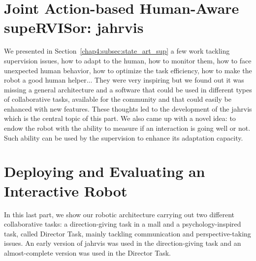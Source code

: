 \documentclass[english,a4paper,11pt,twoside]{StyleThese}
\begin{document}
\part{Joint Action-based Human-Aware supeRVISor: \acrshort{jahrvis}}\label{part:part3}
\begin{partintro}
	We presented in Section~\ref{chap4:subsec:state_art_sup} a few work tackling supervision issues, \ie how to adapt to the human, how to monitor them, how to face unexpected human behavior, how to optimize the task efficiency, how to make the robot a good human helper... They were very inspiring but we found out it was missing a general architecture and a software that could be used in different types of collaborative tasks, available for the community and that could easily be enhanced with new features. These thoughts led to the development of the \acrfull{jahrvis} which is the central topic of this part. We also came up with a novel idea: to endow the robot with the ability to measure if an interaction is going well or not. Such ability can be used by the supervision to enhance its adaptation capacity.
\end{partintro}





\part{Deploying and Evaluating an Interactive Robot}\label{part:part4}
\begin{partintro}
	In this last part, we show our robotic architecture carrying out two different collaborative tasks: a direction-giving task in a mall and a psychology-inspired task, called Director Task, mainly tackling communication and perspective-taking issues. An early version of \acrshort{jahrvis} was used in the direction-giving task and an almost-complete version was used in the Director Task.
\end{partintro}	






\newpage
\listoftodos[Notes]


\appendix
{}



\end{document}
